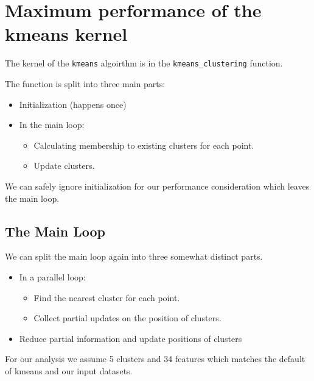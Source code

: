 \documentclass[]{article}
\title{}
\author{}
\begin{document}
\maketitle

\begin{abstract}

\end{abstract}

\section{Maximum performance of the kmeans kernel}

The kernel of the \texttt{kmeans} algoirthm is in the \texttt{kmeans\_clustering} function.

The function is split into three main parts:
\begin{itemize}
	\item Initialization (happens once)
	\item In the main loop:
	\begin{itemize}
		\item Calculating membership to existing clusters for each point.
		\item Update clusters.
	\end{itemize}
\end{itemize}

We can safely ignore initialization for our performance consideration which leaves the main loop.

\newpage
\subsection{The Main Loop}

We can split the main loop again into three somewhat distinct parts.
\begin{itemize}
	\item In a parallel loop:
\begin{itemize}
	\item Find the nearest cluster for each point.
	\item Collect partial updates on the position of clusters.
\end{itemize}
	\item Reduce partial information and update positions of clusters 	
\end{itemize}

For our analysis we assume 5 clusters and 34 features which matches
the default of kmeans and our input datasets.
\end{document}
